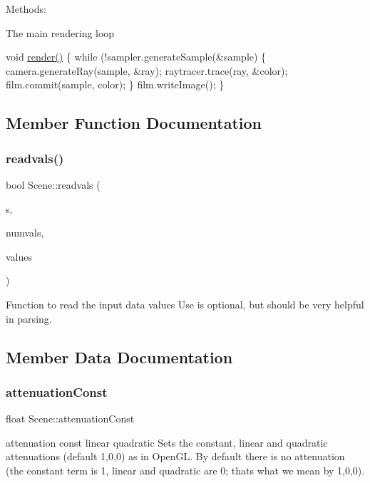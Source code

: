 Methods\+:

The main rendering loop

void \mbox{\hyperlink{class_scene_a4ddf2d16f371ee9533b3faf1dd5ddfb1}{render()}} \{ while (!sampler.generate\+Sample(\&sample) \{ camera.\+generate\+Ray(sample, \&ray); raytracer.\+trace(ray, \&color); film.\+commit(sample, color); \} film.\+write\+Image(); \} 

\subsection{Member Function Documentation}
\mbox{\label{class_scene_aa3778cb6ad047c2625e30d054260feb2}} 
\subsubsection{\texorpdfstring{readvals()}{readvals()}}
{\footnotesize\ttfamily bool Scene\+::readvals (\begin{DoxyParamCaption}\item[{stringstream \&}]{s,  }\item[{const int}]{numvals,  }\item[{G\+Lfloat $\ast$}]{values }\end{DoxyParamCaption})\hspace{0.3cm}{\ttfamily [inline]}}

Function to read the input data values Use is optional, but should be very helpful in parsing. 

\subsection{Member Data Documentation}
\mbox{\label{class_scene_a0bb543364c97ad089c167f95e5b06881}} 
\subsubsection{\texorpdfstring{attenuation\+Const}{attenuationConst}}
{\footnotesize\ttfamily float Scene\+::attenuation\+Const}

attenuation const linear quadratic Sets the constant, linear and quadratic attenuations (default 1,0,0) as in Open\+GL. By default there is no attenuation (the constant term is 1, linear and quadratic are 0; that\textquotesingle{}s what we mean by 1,0,0). \mbox{\label{class_scene_a0a38f5f1255de8f6f5826e7dacb8cbd7}} 
